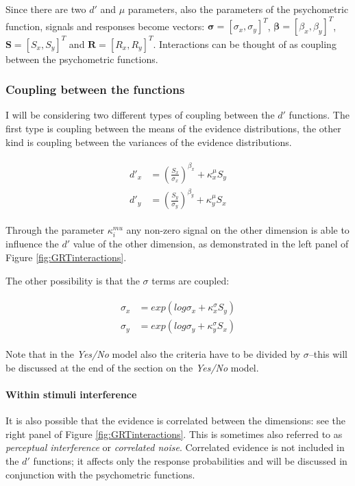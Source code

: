 \documentclass{article}\usepackage{knitr}
\begin{document}
Since there are two $d'$ and $\mu$ parameters, also the parameters of the psychometric function, signals and responses become vectors: $\bm{\sigma} = [\sigma_x, \sigma_y]^T$, $\bm{\beta} = [\beta_x, \beta_y]^T$, $\bm{S} = [S_x, S_y]^T$ and $\bm{R} = [R_x, R_y]^T$. Interactions can be thought of as coupling between the psychometric functions.

\subsubsection{Coupling between the functions}

I will be considering two different types of coupling between the $d'$ functions. The first type is coupling between the means of the evidence distributions, the other kind is coupling between the variances of the evidence distributions. 

\begin{align}
\label{eq:twodimdprime}
\begin{split}
d'_x &= (\frac{S_x}{\sigma_x})^{\beta_x} + \kappa_x^{\mu} S_y \\
d'_y &= (\frac{S_y}{\sigma_y})^{\beta_y} + \kappa_y^{\mu} S_x
\end{split}
\end{align}

Through the parameter $\kappa_i^{mu}$ any non-zero signal on the other dimension is able to influence the $d'$ value of the other dimension, as demonstrated in the left panel of Figure \ref{fig:GRTinteractions}.

The other possibility is that the $\sigma$ terms are coupled:

\begin{align}
\label{eq:varshift}
\begin{split}
\sigma_x &= exp(log\sigma_x + \kappa_x^{\sigma} S_y) \\
\sigma_y &= exp(log\sigma_y + \kappa_y^{\sigma} S_x)
\end{split}
\end{align}

Note that in the \textit{Yes/No} model also the criteria have to be divided by $\sigma$--this will be discussed at the end of the section on the \textit{Yes/No} model.

\paragraph{Within stimuli interference}

It is also possible that the evidence is correlated between the dimensions: see the right panel of Figure \ref{fig:GRTinteractions}. This is sometimes also referred to as \textit{perceptual interference} or \textit{correlated noise}. Correlated evidence is not included in the $d'$ functions; it affects only the response probabilities and will be discussed in conjunction with the psychometric functions. 
\end{document}
